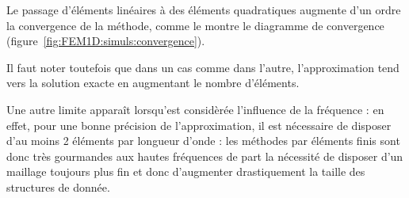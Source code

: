 Le passage d'éléments linéaires à des éléments quadratiques augmente d'un ordre la convergence de la méthode, comme le
montre le diagramme de convergence (figure~\ref{fig:FEM1D:simuls:convergence}).

Il faut noter toutefois que dans un cas comme dans l'autre, l'approximation tend vers la solution exacte en augmentant
le nombre d'éléments.

Une autre limite apparaît lorsqu'est considèrée l'influence de la fréquence : en effet, pour une bonne précision de
l'approximation, il est nécessaire de disposer d'au moins 2 éléments par longueur d'onde : les méthodes par éléments
finis sont donc très gourmandes aux hautes fréquences de part la nécessité de disposer d'un maillage toujours plus fin
et donc d'augmenter drastiquement la taille des structures de donnée.

